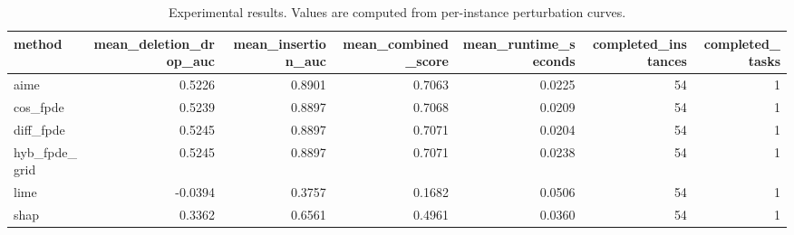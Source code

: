 \begin{table}[t]
\caption{Experimental results. Values are computed from per-instance perturbation curves.}
\label{tab:main_results_computed}
\centering
\begin{tabular}{lrrrrrr}
\toprule
method & mean\_deletion\_drop\_auc & mean\_insertion\_auc & mean\_combined\_score & mean\_runtime\_seconds & completed\_instances & completed\_tasks \\
\midrule
aime & 0.5226 & 0.8901 & 0.7063 & 0.0225 & 54 & 1 \\
cos\_fpde & 0.5239 & 0.8897 & 0.7068 & 0.0209 & 54 & 1 \\
diff\_fpde & 0.5245 & 0.8897 & 0.7071 & 0.0204 & 54 & 1 \\
hyb\_fpde\_grid & 0.5245 & 0.8897 & 0.7071 & 0.0238 & 54 & 1 \\
lime & -0.0394 & 0.3757 & 0.1682 & 0.0506 & 54 & 1 \\
shap & 0.3362 & 0.6561 & 0.4961 & 0.0360 & 54 & 1 \\
\bottomrule
\end{tabular}

\end{table}
